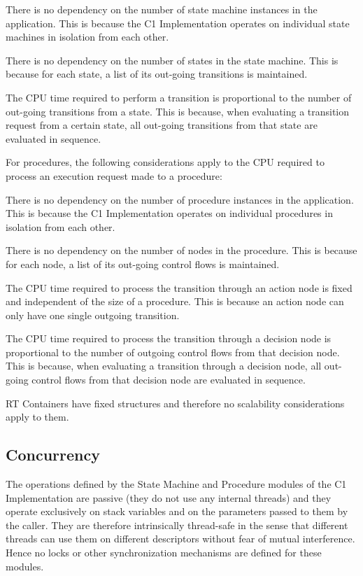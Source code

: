 \documentclass[a4paper,10pt]{article}
\newenvironment{fw_itemize}						%
{\begin{itemize}
  \setlength{\itemsep}{1mm}
  \setlength{\parskip}{0pt}
  \setlength{\parsep}{0pt}}
{\end{itemize}}
\begin{document}
\begin{fw_itemize}
\item There is no dependency on the number of state machine instances in the application. 
This is because the C1 Implementation operates on individual state machines in isolation from each other. 
\item There is no dependency on the number of states in the state machine. 
This is because for each state, a list of its out-going transitions is maintained.  
\item The CPU time required to perform a transition is proportional to the number of out-going 
transitions from a state. This is because, when evaluating 
a transition request from a certain state, all out-going transitions from that state are evaluated in sequence.
\end{fw_itemize}

For procedures, the following considerations apply to the CPU required to process an execution 
request made to a procedure:

\begin{fw_itemize}
\item There is no dependency on the number of procedure instances in the application. 
This is because the C1 Implementation operates on individual procedures in isolation from each other. 
\item There is no dependency on the number of nodes in the procedure. 
This is because for each node, a list of its out-going control flows is maintained.  
\item The CPU time required to process the transition through an action node is fixed and independent
of the size of a procedure.
This is because an action node can only have one single outgoing transition.
\item 
The CPU time required to process the transition through a decision node is proportional to the number
of outgoing control flows from that decision node. This is because, when evaluating 
a transition through a decision node, all out-going control flows from that decision node are evaluated 
in sequence.
\end{fw_itemize}

RT Containers have fixed structures and therefore no scalability considerations apply to them.

\subsection{Concurrency}\label{sec:concurrency}
The operations defined by the State Machine and Procedure modules of the C1 Implementation are passive (they do not use any internal threads) and they operate exclusively on stack variables and on the parameters passed to them by the caller. They are therefore intrinsically thread-safe in the sense that different threads can use them on different descriptors without fear of mutual interference. Hence no locks or other synchronization mechanisms are defined for these modules.
\end{document}
